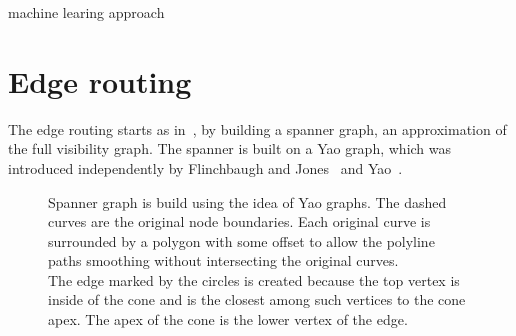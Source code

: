 \documentclass{gd-llncs}
\begin{document}
\cite{gibson2013survey}

machine learing approach
\cite{kwon2017would}

\cite{lin2013interactive}

\cite{cosmograph}

\section*{Edge routing}
The edge routing starts as in~\cite{dwyer2010fast}, by building a spanner graph, an approximation of the full visibility graph. The spanner is built on a Yao graph, which was introduced independently by Flinchbaugh and Jones~\cite{flinchbaugh1981strong}  and Yao~\cite{yao1982constructing}.
\begin{figure}[h]
  \centering
  
  \caption{Spanner graph is build using the idea of Yao graphs. The dashed curves are the original node boundaries. Each original curve is surrounded by a polygon with some offset to allow the polyline paths smoothing without intersecting the original curves. \\
    The edge marked by the circles is created because the top vertex is inside of the cone and is the closest among such vertices to the cone apex. The apex of the cone is the lower vertex of the edge.}
\end{figure}
\end{document}
